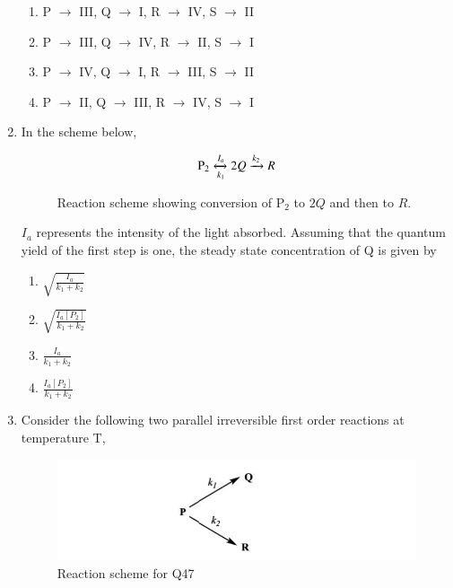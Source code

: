 \documentclass[journal,12pt,onecolumn]{IEEEtran}
\theoremstyle{remark}
\begin{document}
\begin{enumerate}
\begin{multicols}{2}
\begin{enumerate}
\item P $\rightarrow$ III, Q $\rightarrow$ I, R $\rightarrow$ IV, S $\rightarrow$ II
\item P $\rightarrow$ III, Q $\rightarrow$ IV, R $\rightarrow$ II, S $\rightarrow$ I
\item P $\rightarrow$ IV, Q $\rightarrow$ I, R $\rightarrow$ III, S $\rightarrow$ II
\item P $\rightarrow$ II, Q $\rightarrow$ III, R $\rightarrow$ IV, S $\rightarrow$ I
\end{enumerate}
\end{multicols}



\item In the scheme below,
\begin{figure}[H]
    \centering
    \[
    \mathrm{P_2} \xleftrightarrow[k_1]{I_a} 2Q \xrightarrow{k_2} R
    \]
    \caption{Reaction scheme showing conversion of $\mathrm{P_2}$ to $2Q$ and then to $R$.}
    \label{fig:Q46_scheme}
\end{figure}

$I_a$ represents the intensity of the light absorbed. Assuming that the quantum yield of the first step is one, the steady state concentration of Q is given by

\begin{multicols}{2}
\begin{enumerate}
\item $\sqrt{\frac{I_a}{k_1 + k_2}}$
\item $\sqrt{\frac{I_a[P_2]}{k_1 + k_2}}$
\item $\frac{I_a}{k_1 + k_2}$
\item $\frac{I_a[P_2]}{k_1 + k_2}$
\end{enumerate}
\end{multicols}



\item Consider the following two parallel irreversible first order reactions at temperature T, \hfill{}

\begin{figure}[H]
    \centering
    \includegraphics[width=0.7\linewidth]{figs/image22.png}
    \caption{Reaction scheme for Q47}
    \label{fig:q47}
\end{figure}


\end{enumerate}
\end{document}
